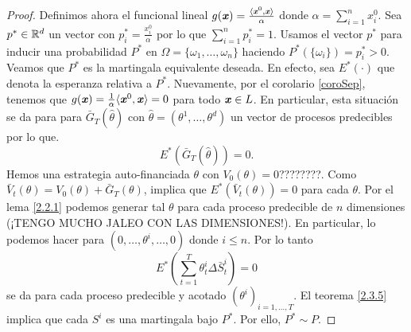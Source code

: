 \begin{proof}
	Definimos ahora el funcional lineal $ g(\textbf{\emph{x}}) = \frac{\langle \textbf{\emph{x}}^0, \textbf{\emph{x}}\rangle}{\alpha} $ donde $ \alpha = \sum_{i=1}^{n} x^0_i$. Sea $ p^* \in \mathbb{R}^d$ un vector con $ p^*_i = \frac{x_i^0}{\alpha} $ por lo que $ \sum_{i=1}^{n} p^*_i = 1 $. Usamos el vector $ p^* $ para inducir una probabilidad $ P^* $ en $ \Omega = \{\omega_1,\dots,\omega_n\} $ haciendo $ P^*(\{\omega_i\}) = p^*_{i} > 0 $. Veamos que $ P^* $ es la martingala equivalente deseada. En efecto, sea $ E^*(\cdot) $ que denota la esperanza relativa a $ P^* $. Nuevamente, por el corolario \ref{coroSep}, tenemos que $ g(\textbf{\emph{x}}) = \frac{1}{\alpha}\langle \textbf{\emph{x}}^0,\textbf{\emph{x}}\rangle = 0$ para todo $ \textbf{\emph{x}}\in L $. En particular, esta situación se da para  para $ \bar{G}_T (\hat{\theta}) $ con $ \hat{\theta}=(\theta^1,\dots,\theta^d) $ un vector de procesos predecibles por lo que.
	\[ E^*(\bar{G}_T (\hat{\theta})) = 0.\]
	 Hemos una estrategia auto-financiada $ \theta $ con $ V_0(\theta) = 0 $????????. Como $ \bar{V}_t (\theta) = V_0(\theta) + \bar{G}_T (\theta)$, implica que $ E^*(\bar{V}_t (\theta)) = 0 $ para cada $ \theta $. Por el lema \ref{2.2.1} podemos generar tal $ \theta $ para cada proceso predecible de $ n $  dimensiones (¡TENGO MUCHO JALEO CON LAS DIMENSIONES!). En particular, lo podemos hacer para $ (0,\dots, \theta^i,\dots,0) $ donde $ i\leq n $. Por lo tanto
	\[
	E^*(\sum_{t=1}^{T}\theta_t^i\Delta \bar{S}^i_t) = 0
	\]
	se da para cada proceso predecible y acotado $ (\theta^i)_{i=1,\dots,T} $. El teorema \ref{2.3.5} implica que cada $ S^i $ es una martingala bajo $ P^* $. Por ello, $ P^* \sim P $.
\end{proof}

